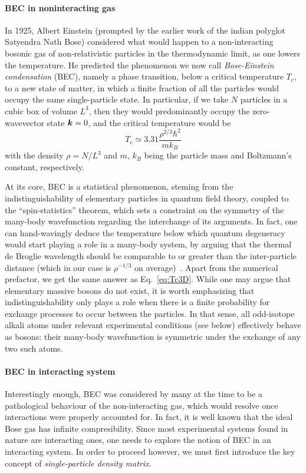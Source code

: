 \paragraph{BEC in noninteracting gas}
In 1925, Albert Einstein (prompted by the earlier work of the indian
polyglot Satyendra Nath Bose) considered what would happen to a
non-interacting bosonic gas of non-relativistic particles in the
thermodynamic limit, as one lowers the temperature. He predicted the
phenomenon we now call \textit{Bose-Einstein condensation} (BEC),
namely a phase transition, below a critical temperature $T_c$, to a
new state of matter, in which a finite fraction of all the particles
would occupy the same single-particle state. In particular, if we take
$N$ particles in a cubic box of volume $L^3$, then they would
predominantly occupy the zero-wavevector state $\bm{k} = 0$, and the
critical temperature would be~\cite{9780198507192}
%
\begin{equation}\label{eq:Tc3D}
  T_c \simeq 3.31 \frac{\rho^{2/3}\hbar^2}{m k_B}
\end{equation}
%
with the density $\rho = N/L^3$ and $m$, $k_B$ being the particle
mass and Boltzmann's constant, respectively.

At its core, BEC is a statistical phenomenon, steming from the
indistinguishability of elementary particles in quantum field theory,
coupled to the ``spin-statistics'' theorem, which sets a constraint on
the symmetry of the many-body wavefunction regarding the interchange
of its arguments. In fact, one can hand-wavingly deduce the
temperature below which quantum degeneracy would start playing a role
in a many-body system, by arguing that the thermal de Broglie
wavelength should be comparable to or greater than the inter-particle
distance (which in our case is $\rho^{-1/3}$ on
average)~\cite{Leggett_1999}. Apart from the numerical prefactor, we
get the same answer as Eq.~\eqref{eq:Tc3D}. While one may argue that
elementary massive bosons do not exist, it is worth emphasizing that
indistinguishability only plays a role when there is a finite
probability for exchange processes to occur between the particles. In
that sense, all odd-isotope alkali atoms under relevant experimental
conditions (see below) effectively behave as bosons: their many-body
wavefunction is symmetric under the exchange of any two such atoms.

\paragraph{BEC in interacting system}
Interestingly enough, BEC was considered by many at the time to be a
pathological behaviour of the non-interacting gas, which would resolve
once interactions were properly accounted for. In fact, it is well
known that the ideal Bose gas has infinite compresibility. Since most
experimental systems found in nature are interacting ones, one needs
to explore the notion of BEC in an interacting system. In order to
proceed however, we must first introduce the key concept of
\textit{single-particle density matrix}.

